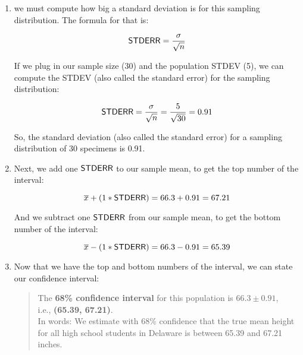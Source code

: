 \documentclass[../../../main.tex]{subfiles}
\begin{document}
\begin{enumerate}

  \item we must compute how big a standard deviation is for this sampling distribution. The formula for that is: 

  \begin{equation*}
    \StdErr/ = \frac{\populationstdev}{\sqrt{\samplesize/}}
  \end{equation*}

  \noindent
  If we plug in our sample size (30) and the population STDEV (5), we can compute the STDEV (also called the standard error) for the sampling distribution:

  \begin{equation*}
    \StdErr/ = \frac{\populationstdev}{\sqrt{\samplesize/}} = \frac{5}{\sqrt{30}} = 0.91
  \end{equation*}

  \noindent
  So, the standard deviation (also called the standard error) for a sampling distribution of 30 specimens is 0.91. 

  \item Next, we add one $\StdErr/$ to our sample mean, to get the top number of the interval: 

  \begin{equation*}
    \samplemean{x} + (1 * \StdErr/) = 66.3 + 0.91 = 67.21
  \end{equation*}

  \noindent
  And we subtract one $\StdErr/$ from our sample mean, to get the bottom number of the interval:

  \begin{equation*}
    \samplemean{x} - (1 * \StdErr/) = 66.3 - 0.91 = 65.39
  \end{equation*}  

  \item Now that we have the top and bottom numbers of the interval, we can state our confidence interval:

  \begin{quote}
    The \textbf{68\% confidence interval} for this population is $\mathbf{66.3 \pm 0.91}$, \\
    i.e., \textbf{(65.39, 67.21)}. \\

    In words: We estimate with 68\% confidence that the true mean height for all high school students in Delaware is between 65.39 and 67.21 inches.
  \end{quote}

\end{enumerate}
\end{document}
